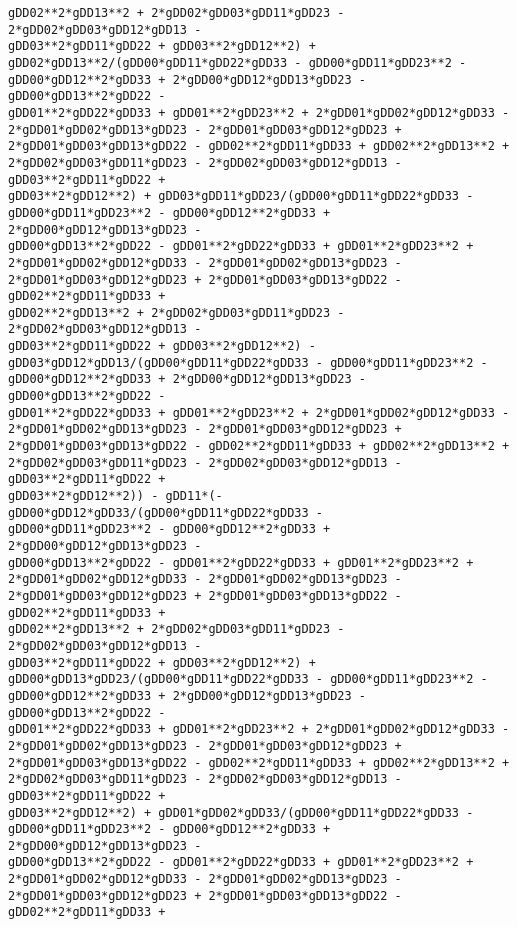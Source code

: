 \documentclass[landscape,letterpaper,10pt,english]{article}
\begin{document}
\begin{Verbatim}[commandchars=\\\{\}]
gDD02**2*gDD13**2 + 2*gDD02*gDD03*gDD11*gDD23 - 2*gDD02*gDD03*gDD12*gDD13 -
gDD03**2*gDD11*gDD22 + gDD03**2*gDD12**2) +
gDD02*gDD13**2/(gDD00*gDD11*gDD22*gDD33 - gDD00*gDD11*gDD23**2 -
gDD00*gDD12**2*gDD33 + 2*gDD00*gDD12*gDD13*gDD23 - gDD00*gDD13**2*gDD22 -
gDD01**2*gDD22*gDD33 + gDD01**2*gDD23**2 + 2*gDD01*gDD02*gDD12*gDD33 -
2*gDD01*gDD02*gDD13*gDD23 - 2*gDD01*gDD03*gDD12*gDD23 +
2*gDD01*gDD03*gDD13*gDD22 - gDD02**2*gDD11*gDD33 + gDD02**2*gDD13**2 +
2*gDD02*gDD03*gDD11*gDD23 - 2*gDD02*gDD03*gDD12*gDD13 - gDD03**2*gDD11*gDD22 +
gDD03**2*gDD12**2) + gDD03*gDD11*gDD23/(gDD00*gDD11*gDD22*gDD33 -
gDD00*gDD11*gDD23**2 - gDD00*gDD12**2*gDD33 + 2*gDD00*gDD12*gDD13*gDD23 -
gDD00*gDD13**2*gDD22 - gDD01**2*gDD22*gDD33 + gDD01**2*gDD23**2 +
2*gDD01*gDD02*gDD12*gDD33 - 2*gDD01*gDD02*gDD13*gDD23 -
2*gDD01*gDD03*gDD12*gDD23 + 2*gDD01*gDD03*gDD13*gDD22 - gDD02**2*gDD11*gDD33 +
gDD02**2*gDD13**2 + 2*gDD02*gDD03*gDD11*gDD23 - 2*gDD02*gDD03*gDD12*gDD13 -
gDD03**2*gDD11*gDD22 + gDD03**2*gDD12**2) -
gDD03*gDD12*gDD13/(gDD00*gDD11*gDD22*gDD33 - gDD00*gDD11*gDD23**2 -
gDD00*gDD12**2*gDD33 + 2*gDD00*gDD12*gDD13*gDD23 - gDD00*gDD13**2*gDD22 -
gDD01**2*gDD22*gDD33 + gDD01**2*gDD23**2 + 2*gDD01*gDD02*gDD12*gDD33 -
2*gDD01*gDD02*gDD13*gDD23 - 2*gDD01*gDD03*gDD12*gDD23 +
2*gDD01*gDD03*gDD13*gDD22 - gDD02**2*gDD11*gDD33 + gDD02**2*gDD13**2 +
2*gDD02*gDD03*gDD11*gDD23 - 2*gDD02*gDD03*gDD12*gDD13 - gDD03**2*gDD11*gDD22 +
gDD03**2*gDD12**2)) - gDD11*(-gDD00*gDD12*gDD33/(gDD00*gDD11*gDD22*gDD33 -
gDD00*gDD11*gDD23**2 - gDD00*gDD12**2*gDD33 + 2*gDD00*gDD12*gDD13*gDD23 -
gDD00*gDD13**2*gDD22 - gDD01**2*gDD22*gDD33 + gDD01**2*gDD23**2 +
2*gDD01*gDD02*gDD12*gDD33 - 2*gDD01*gDD02*gDD13*gDD23 -
2*gDD01*gDD03*gDD12*gDD23 + 2*gDD01*gDD03*gDD13*gDD22 - gDD02**2*gDD11*gDD33 +
gDD02**2*gDD13**2 + 2*gDD02*gDD03*gDD11*gDD23 - 2*gDD02*gDD03*gDD12*gDD13 -
gDD03**2*gDD11*gDD22 + gDD03**2*gDD12**2) +
gDD00*gDD13*gDD23/(gDD00*gDD11*gDD22*gDD33 - gDD00*gDD11*gDD23**2 -
gDD00*gDD12**2*gDD33 + 2*gDD00*gDD12*gDD13*gDD23 - gDD00*gDD13**2*gDD22 -
gDD01**2*gDD22*gDD33 + gDD01**2*gDD23**2 + 2*gDD01*gDD02*gDD12*gDD33 -
2*gDD01*gDD02*gDD13*gDD23 - 2*gDD01*gDD03*gDD12*gDD23 +
2*gDD01*gDD03*gDD13*gDD22 - gDD02**2*gDD11*gDD33 + gDD02**2*gDD13**2 +
2*gDD02*gDD03*gDD11*gDD23 - 2*gDD02*gDD03*gDD12*gDD13 - gDD03**2*gDD11*gDD22 +
gDD03**2*gDD12**2) + gDD01*gDD02*gDD33/(gDD00*gDD11*gDD22*gDD33 -
gDD00*gDD11*gDD23**2 - gDD00*gDD12**2*gDD33 + 2*gDD00*gDD12*gDD13*gDD23 -
gDD00*gDD13**2*gDD22 - gDD01**2*gDD22*gDD33 + gDD01**2*gDD23**2 +
2*gDD01*gDD02*gDD12*gDD33 - 2*gDD01*gDD02*gDD13*gDD23 -
2*gDD01*gDD03*gDD12*gDD23 + 2*gDD01*gDD03*gDD13*gDD22 - gDD02**2*gDD11*gDD33 +

\end{Verbatim}
\end{document}
